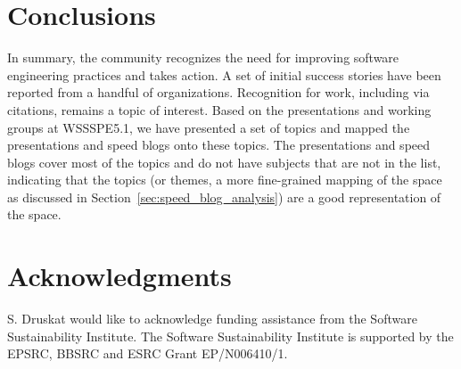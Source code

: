 \documentclass[11pt,letterpaper]{article}
\newcommand{\katznote}[1]{ {\textcolor{magenta}    { ***Dan: #1 }}}
\newcommand{\LXnote}[1]{  {\textcolor{orange}      { ***Alex: #1 }}}
\begin{document}
\section{Conclusions} \label{sec:conclusions}

In summary, the community recognizes the need for improving software engineering practices and takes action. A set of initial success stories have been reported from a handful of organizations. Recognition for work, including via citations, remains a topic of interest. 
%
Based on the presentations and working groups at WSSSPE5.1, we have presented a set of topics and mapped the %
presentations and speed blogs onto these topics. The presentations and speed blogs cover most of the topics and do not have subjects that are not in the list, indicating that the topics (or themes, a more fine-grained mapping of the space as discussed in Section~\ref{sec:speed_blog_analysis}) are a good representation of the space.


\section*{Acknowledgments} \label{sec:acks}

S. Druskat would like to acknowledge funding assistance from the Software Sustainability Institute. The Software Sustainability Institute is supported by the EPSRC, BBSRC and ESRC Grant EP/N006410/1.



\newpage



\end{document}
